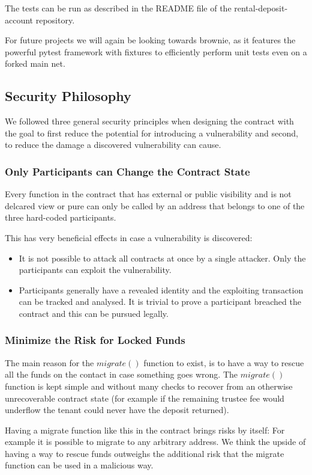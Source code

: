 \documentclass[12pt,a4paper,titlepage,oneside,english]{article}
\begin{document}
The tests can be run as described in the README file of the rental-deposit-account repository.

For future projects we will again be looking towards brownie, as it features the powerful pytest framework with fixtures to efficiently perform unit tests even on a forked main net.

\subsection{Security Philosophy}

We followed three general security principles when designing the contract with the goal to first reduce the potential for introducing a vulnerability and second, to reduce the damage a discovered vulnerability can cause.

\subsubsection{Only Participants can Change the Contract State}
Every function in the contract that has external or public visibility and is not delcared view or pure can only be called by an address that belongs to one of the three hard-coded participants.

This has very beneficial effects in case a vulnerability is discovered:
\begin{itemize}
	\item It is not possible to attack all contracts at once by a single attacker. Only the participants can exploit the vulnerability.
	\item Participants generally have a revealed identity and the exploiting transaction can be tracked and analysed. It is trivial to prove a participant breached the contract and this can be pursued legally.
\end{itemize}

\subsubsection{Minimize the Risk for Locked Funds}
The main reason for the $migrate()$ function to exist, is to have a way to rescue all the funds on the contact in case something goes wrong. The $migrate()$ function is kept simple and without many checks to recover from an otherwise unrecoverable contract state (for example if the remaining trustee fee would underflow the tenant could never have the deposit returned). 

Having a migrate function like this in the contract brings risks by itself: For example it is possible to migrate to any arbitrary address. We think the upside of having a way to rescue funds outweighs the additional risk that the migrate function can be used in a malicious way.
\end{document}
